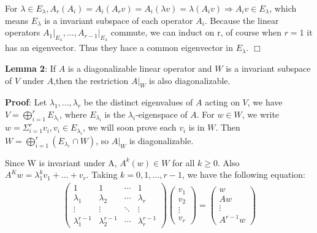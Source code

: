 \documentclass[]{ctexart}
\begin{document}
			For $\lambda\in E_{\lambda},A_r(A_i)=A_i(A_rv)=A_i(\lambda v)=\lambda (A_i v)\Rightarrow A_i v\in E_{\lambda}$, which means $E_{\lambda}$ is a invariant subspace of each operator $A_i$. Because the linear operators $\left.A_{1}\right|_{E_{\lambda}}, \dots,\left.A_{r-1}\right|_{E_{\lambda}}$ commute, we can induct on r, of course when $r=1$ it has an eigenvector. Thus they hace a common eigenvector in $E_{\lambda}$. \qquad $\Box$
		
			\textbf{Lemma 2}: If $ A $ is a diagonalizable linear operator and $ W $ is a invariant subspace of $ V $ under $ A $,then the restriction $A|_W$ is also diagonalizable. 
		
			\textbf{Proof}: Let $\lambda_1,...,\lambda_r$ be the distinct eigenvalues of $ A $ acting on $ V $, we have $V=\bigoplus^r_{i=1}E_{\lambda_i}$, where $E_{\lambda_i}$ is the $\lambda_i$-eigenspace of $ A $. For $w\in W$, we write $w=\Sigma_{i=1}^{r}v_i,v_i\in E_{\lambda_i}$, we will soon prove each $v_i$ is in $W$. Then $W=\bigoplus^r_{i=1}(E_{\lambda_r}\cap W)$, so  $A|_W$ is diagonalizable.
		
			Since W is invariant under A, $A^k(w)\in W$ for all $k\geq 0$. Also $A^Kw=\lambda_1^kv_1+...+v_r$. Taking $k=0,1,...,r-1$, we have the following equation:
			\begin{equation*}
			\begin{aligned}
				\left(\begin{array}{cccc}
				1 & 1 & \cdots & 1 \\
				\lambda_{1} & \lambda_{2} & \cdots & \lambda_{r} \\
				\vdots & \vdots & \ddots & \vdots \\
				\lambda_{1}^{r-1} & \lambda_{2}^{r-1} & \cdots & \lambda_{r}^{r-1}
				\end{array}\right)\left(\begin{array}{c}
				v_{1} \\
				v_{2} \\
				\vdots \\
				v_{r}
				\end{array}\right)=\left(\begin{array}{c}
				w \\
				A w \\
				\vdots \\
				A^{r-1} w
				\end{array}\right)
			\end{aligned}
			\end{equation*}
		
\end{document}
